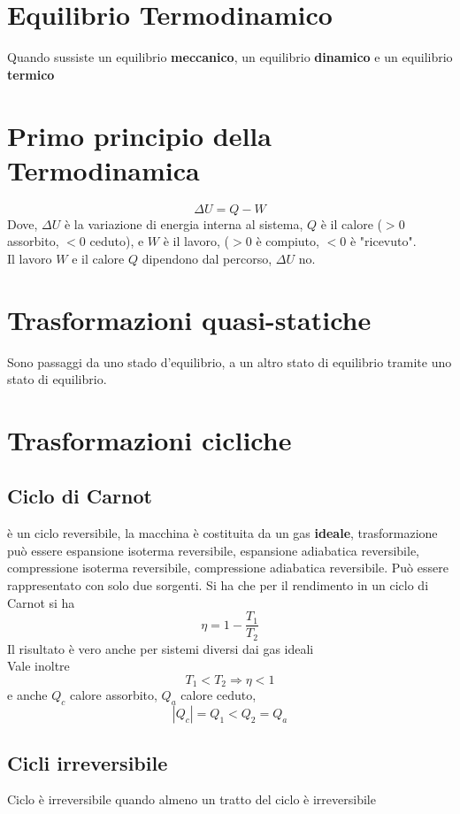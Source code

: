 \documentclass[a4paper]{report}
\begin{document}
  \section{Equilibrio Termodinamico}
  Quando sussiste un equilibrio \textbf{meccanico}, un equilibrio \textbf{dinamico} e un equilibrio \textbf{termico}\\

  \section{Primo principio della Termodinamica}
  \[ \Delta U = Q - W \]
  Dove, $\Delta U$ è la variazione di energia interna al sistema, $Q$ è il calore ($>0$ assorbito, $<0$ ceduto), e $W$ è il lavoro, ($>0$ è compiuto, $<0$ è "ricevuto".\\
  Il lavoro $W$ e il calore $Q$ dipendono dal percorso, $\Delta U$ no.

  \section{Trasformazioni quasi-statiche}
  Sono passaggi da uno stado d'equilibrio, a un altro stato di equilibrio tramite uno stato di equilibrio.

  \section{Trasformazioni cicliche}
  \subsection{Ciclo di Carnot}
  è un ciclo reversibile, la macchina è costituita da un gas \textbf{ideale}, trasformazione può essere espansione isoterma reversibile, espansione adiabatica reversibile, compressione isoterma reversibile, compressione adiabatica reversibile. Può essere rappresentato con solo due sorgenti. Si ha che per il rendimento in un ciclo di Carnot si ha
  \[ \eta = 1 - \frac{T_1}{T_2}\]
  Il risultato è vero anche per sistemi diversi dai gas ideali \\
  Vale inoltre
  \[ T_1 < T_2 \Rightarrow \eta < 1 \]
  e anche $Q_c$ calore assorbito, $Q_a$ calore ceduto,
  \[ |Q_c| = Q_1 < Q_2 = Q_a \]

  \subsection{Cicli irreversibile}
  Ciclo è irreversibile quando almeno un tratto del ciclo è irreversibile
\end{document}

